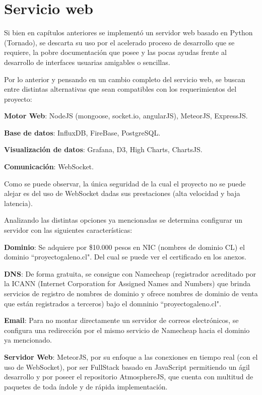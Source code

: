 \section{Servicio web}

Si bien en capítulos anteriores se implementó un servidor web basado en Python (Tornado), se descarta su uso por el acelerado proceso de desarrollo que se requiere, la pobre documentación que posee y las pocas ayudas frente al desarrollo de interfaces usuarias amigables o sencillas.

Por lo anterior y pensando en un cambio completo del servicio web, se buscan entre distintas alternativas que sean compatibles con los requerimientos del proyecto:

\textbf{Motor Web}: NodeJS (mongoose, socket.io, angularJS), MeteorJS, ExpressJS.

\textbf{Base de datos}: InfluxDB, FireBase, PostgreSQL.

\textbf{Visualización de datos}: Grafana, D3, High Charts, ChartsJS.

\textbf{Comunicación}: WebSocket.

Como se puede observar, la única seguridad de la cual el proyecto no se puede alejar es del uso de WebSocket
dadas sus prestaciones (alta velocidad y baja latencia).

\newpage


Analizando las distintas opciones ya mencionadas se determina configurar un servidor con las siguientes características:
 
 \textbf{Dominio}: Se adquiere por \$10.000 pesos en NIC (nombres de dominio CL) el dominio ``proyectogaleno.cl". Del cual se puede ver el certificado en los anexos.
 
\textbf{DNS}: De forma gratuita, se consigue con Namecheap (registrador acreditado por la ICANN (Internet Corporation for Assigned Names and Numbers) que brinda servicios de registro de nombres de dominio y ofrece nombres de dominio de venta que están registrados a terceros) bajo el domninio ``proyectogaleno.cl".

\textbf{Email}: Para no montar directamente un servidor de correos electrónicos, se configura una redirección por el mismo servicio de Namecheap hacia el dominio ya mencionado.

\textbf{Servidor Web}: MeteorJS, por su enfoque a las conexiones en tiempo real (con el uso de WebSocket), por ser FullStack basado en JavaScript permitiendo un ágil desarrollo y por poseer el repositorio AtmosphereJS, que cuenta con multitud de paquetes de toda índole y de rápida implementación.

